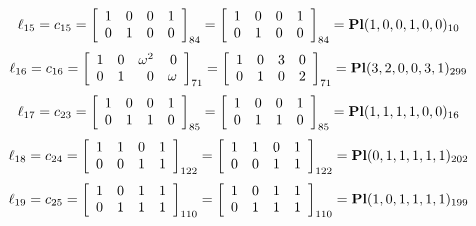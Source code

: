 $$
\ell_{15} = c_{15} = 
\left[
\begin{array}{*{4}{r}}
1 & 0 & 0 & 1\\
0 & 1 & 0 & 0\\
\end{array}
\right]
_{84}
=
\left[
\begin{array}{*{4}c}
1  & 0  & 0  & 1\\
0  & 1  & 0  & 0\\
\end{array}
\right]_{84}
={\rm\bf Pl}(1,0,0,1,0,0 )_{10}$$
$$
\ell_{16} = c_{16} = 
\left[
\begin{array}{*{4}{r}}
1 & 0 & \omega^{2} & 0\\
0 & 1 & 0 & \omega \\
\end{array}
\right]
_{71}
=
\left[
\begin{array}{*{4}c}
1  & 0  & 3  & 0\\
0  & 1  & 0  & 2\\
\end{array}
\right]_{71}
={\rm\bf Pl}(3,2,0,0,3,1 )_{299}$$
$$
\ell_{17} = c_{23} = 
\left[
\begin{array}{*{4}{r}}
1 & 0 & 0 & 1\\
0 & 1 & 1 & 0\\
\end{array}
\right]
_{85}
=
\left[
\begin{array}{*{4}c}
1  & 0  & 0  & 1\\
0  & 1  & 1  & 0\\
\end{array}
\right]_{85}
={\rm\bf Pl}(1,1,1,1,0,0 )_{16}$$
$$
\ell_{18} = c_{24} = 
\left[
\begin{array}{*{4}{r}}
1 & 1 & 0 & 1\\
0 & 0 & 1 & 1\\
\end{array}
\right]
_{122}
=
\left[
\begin{array}{*{4}c}
1  & 1  & 0  & 1\\
0  & 0  & 1  & 1\\
\end{array}
\right]_{122}
={\rm\bf Pl}(0,1,1,1,1,1 )_{202}$$
$$
\ell_{19} = c_{25} = 
\left[
\begin{array}{*{4}{r}}
1 & 0 & 1 & 1\\
0 & 1 & 1 & 1\\
\end{array}
\right]
_{110}
=
\left[
\begin{array}{*{4}c}
1  & 0  & 1  & 1\\
0  & 1  & 1  & 1\\
\end{array}
\right]_{110}
={\rm\bf Pl}(1,0,1,1,1,1 )_{199}$$
